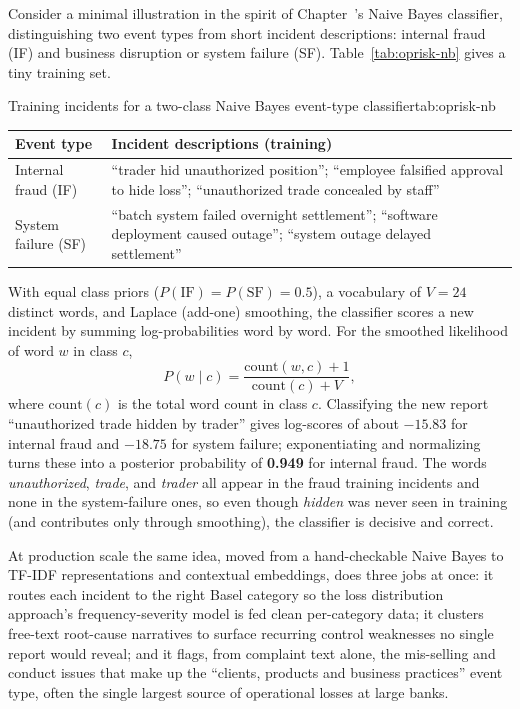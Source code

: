 \documentclass[../ai_in_finance]{subfiles}
\begin{document}
Consider a minimal illustration in the spirit of Chapter~'s Naive Bayes classifier, distinguishing two event types from short incident descriptions: internal fraud (IF) and business disruption or system failure (SF). Table~\ref{tab:oprisk-nb} gives a tiny training set.

\begin{booktable}[htbp]{Training incidents for a two-class Naive Bayes event-type classifier}{tab:oprisk-nb}
\begin{tabular}{L{3.0cm}L{9.5cm}}
\toprule
Event type & Incident descriptions (training) \\
\midrule
Internal fraud (IF) & ``trader hid unauthorized position''; ``employee falsified approval to hide loss''; ``unauthorized trade concealed by staff'' \\
System failure (SF) & ``batch system failed overnight settlement''; ``software deployment caused outage''; ``system outage delayed settlement'' \\
\bottomrule
\end{tabular}
\end{booktable}

With equal class priors ($P(\text{IF}) = P(\text{SF}) = 0.5$), a vocabulary of $V = 24$ distinct words, and Laplace (add-one) smoothing, the classifier scores a new incident by summing log-probabilities word by word. For the smoothed likelihood of word $w$ in class $c$,
\begin{equation}
P(w \mid c) = \frac{\text{count}(w, c) + 1}{\text{count}(c) + V},
\label{eq:oprisk-laplace}
\end{equation}
where $\text{count}(c)$ is the total word count in class $c$. Classifying the new report ``unauthorized trade hidden by trader'' gives log-scores of about $-15.83$ for internal fraud and $-18.75$ for system failure; exponentiating and normalizing turns these into a posterior probability of \textbf{0.949} for internal fraud. The words \emph{unauthorized}, \emph{trade}, and \emph{trader} all appear in the fraud training incidents and none in the system-failure ones, so even though \emph{hidden} was never seen in training (and contributes only through smoothing), the classifier is decisive and correct.

At production scale the same idea, moved from a hand-checkable Naive Bayes to TF-IDF representations and contextual embeddings, does three jobs at once: it routes each incident to the right Basel category so the loss distribution approach's frequency-severity model is fed clean per-category data; it clusters free-text root-cause narratives to surface recurring control weaknesses no single report would reveal; and it flags, from complaint text alone, the mis-selling and conduct issues that make up the ``clients, products and business practices'' event type, often the single largest source of operational losses at large banks.
\end{document}
